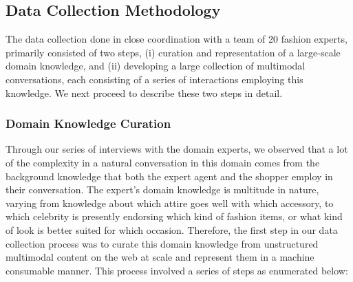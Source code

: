 \documentclass[letterpaper]{article} %
\begin{document}
\subsection{Data Collection Methodology}


The data collection done in close coordination with a team of 20 fashion experts, primarily consisted of two steps, (i) curation and representation of a large-scale domain knowledge, and (ii) developing a large collection of multimodal conversations, each consisting of a series of interactions employing this knowledge. We next proceed to describe these two steps in detail.


 
\subsubsection{Domain Knowledge Curation}

Through our series of interviews with the domain experts, we observed that a lot of the complexity in a natural conversation in this domain comes from the background knowledge that both the expert agent and the shopper employ in their conversation. The expert's domain knowledge is multitude in nature, varying from knowledge about which attire goes well with which accessory, to which celebrity is presently endorsing which kind of fashion items, or what kind of look is better suited for which occasion. Therefore, the first step in our data collection process was to curate this domain knowledge from unstructured multimodal content on the web at scale and represent them in a machine consumable manner. This process involved a series of steps as enumerated below:
\end{document}
